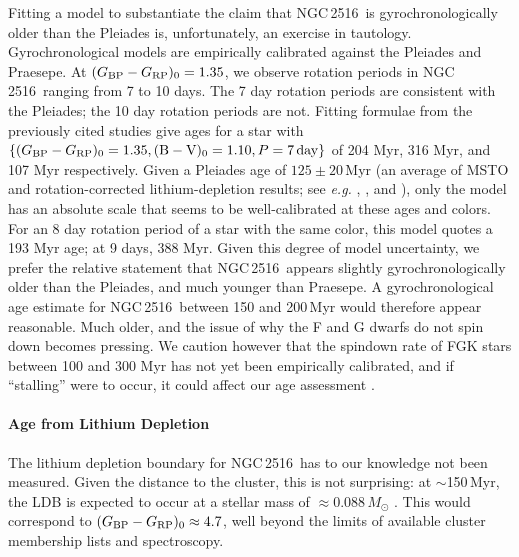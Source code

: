 \documentclass[12pt,twocolumn,tighten]{aastex63}
\newcommand{\cn}{NGC\,2516} %
\newcommand{\bpmrpo}{(G_{\rm BP}-G_{\rm RP})_0}
\begin{document}
Fitting a model to substantiate the claim that \cn\ is
gyrochronologically older than the Pleiades \citep[{\it e.g.}, any
of][]{mamajek_improved_2008,angus_toward_2019,spada_competing_2020}
is, unfortunately, an exercise in tautology.  Gyrochronological models
are empirically calibrated against the Pleiades and Praesepe.  At
$\bpmrpo=1.35$, we observe rotation periods in \cn\ ranging from 7 to
10 days.  The 7 day rotation periods are consistent with the Pleiades;
the 10 day rotation periods are not.  Fitting formulae from the
previously cited studies give ages for a star with $\{\bpmrpo=1.35,
(\mathrm{B}-\mathrm{V})_0=1.10, P=7\,{\rm day}\}$ of 204 Myr, 316 Myr,
and 107 Myr respectively.  Given a Pleiades age of $125\pm20$\,Myr (an
average of MSTO and rotation-corrected lithium-depletion results; see
{\it e.g.} \citealt{stauffer_keck_1998},
\citealt{soderblom_ages_2014}, and \citealt{cummings_2018}), only the
\citet{spada_competing_2020} model has an absolute scale that seems to
be well-calibrated at these ages and colors.  For an 8 day rotation
period of a star with the same color, this model quotes a 193 Myr age;
at 9 days, 388 Myr.  Given this degree of model uncertainty, we prefer
the relative statement that \cn\ appears slightly gyrochronologically
older than the Pleiades, and much younger than Praesepe.  A
gyrochronological age estimate for \cn\ between 150 and 200\,Myr would
therefore appear reasonable.  Much older, and the issue of why the F
and G dwarfs do not spin down becomes pressing.  We caution however
that the spindown rate of FGK stars between 100 and 300 Myr has not
yet been empirically calibrated, and if ``stalling'' were to occur, it
could affect our age assessment \citep[see][]{curtis_rup147_2020}.


\paragraph{Age from Lithium Depletion}
The lithium depletion boundary for \cn\ has to our knowledge not been
measured.  Given the distance to the cluster, this is not surprising:
at $\sim$150\,Myr, the LDB is expected to occur at a stellar mass of
$\approx$0.088\,$M_\odot$ \citep{soderblom_ages_2014}.  This would
correspond to $\bpmrpo\approx4.7$, well beyond the limits of available
cluster membership lists and spectroscopy.
\end{document}
